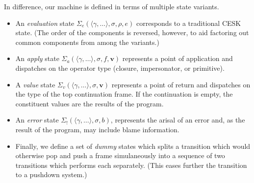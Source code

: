 \documentclass{sigplanconf}
\begin{document}
In difference, our machine is defined in terms of multiple state variants.
\begin{itemize}
\item An \emph{evaluation} state $\Sigma_{e}(\langle\gamma,\dots\rangle,\sigma,\rho,e)$ corresponds to a traditional CESK state.
(The order of the components is reversed, however, to aid factoring out common components from among the variants.)


\item An \emph{apply} state $\Sigma_{a}(\langle\gamma,\dots\rangle,\sigma,f,\mathbf{v})$ represents a point of application and dispatches on the operator type (closure, impersonator, or primitive).
\item A \emph{value} state $\Sigma_{v}(\langle\gamma,\dots\rangle,\sigma,\mathbf{v})$ represents a point of return and dispatches on the type of the top continuation frame.
If the continuation is empty, the constituent values are the results of the program.
\item An \emph{error} state $\Sigma_!(\langle\gamma,\dots\rangle,\sigma,b)$, represents the arisal of an error and, as the result of the program, may include blame information.
\item Finally, we define a set of \emph{dummy} states which splits a transition which would otherwise pop and push a frame simulaneously into a sequence of two transitions which performs each separately.
(This eases further the transition to a pushdown system.)
\end{itemize}


\end{document}
